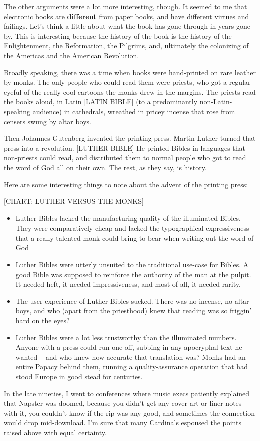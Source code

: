 The other arguments were a lot more interesting, though. It seemed
to me that electronic books are \textbf{different} from paper
books, and have different virtues and failings. Let's think a
little about what the book has gone through in years gone by. This
is interesting because the history of the book is the history of
the Enlightenment, the Reformation, the Pilgrims, and, ultimately
the colonizing of the Americas and the American Revolution.

Broadly speaking, there was a time when books were hand-printed on
rare leather by monks. The only people who could read them were
priests, who got a regular eyeful of the really cool cartoons the
monks drew in the margins. The priests read the books aloud, in
Latin [LATIN BIBLE] (to a predominantly non-Latin-speaking
audience) in cathedrals, wreathed in pricey incense that rose from
censers swung by altar boys.

Then Johannes Gutenberg invented the printing press. Martin Luther
turned that press into a revolution. [LUTHER BIBLE] He printed
Bibles in languages that non-priests could read, and distributed
them to normal people who got to read the word of God all on their
own. The rest, as they say, is history.

Here are some interesting things to note about the advent of the
printing press:

[CHART: LUTHER VERSUS THE MONKS]

\begin{itemize}
\item
  Luther Bibles lacked the manufacturing quality of the illuminated
  Bibles. They were comparatively cheap and lacked the typographical
  expressiveness that a really talented monk could bring to bear when
  writing out the word of God
\item
  Luther Bibles were utterly unsuited to the traditional use-case for
  Bibles. A good Bible was supposed to reinforce the authority of the
  man at the pulpit. It needed heft, it needed impressiveness, and
  most of all, it needed rarity.
\item
  The user-experience of Luther Bibles sucked. There was no incense,
  no altar boys, and who (apart from the priesthood) knew that
  reading was so friggin' hard on the eyes?
\item
  Luther Bibles were a lot less trustworthy than the illuminated
  numbers. Anyone with a press could run one off, subbing in any
  apocryphal text he wanted -- and who knew how accurate that
  translation was? Monks had an entire Papacy behind them, running a
  quality-assurance operation that had stood Europe in good stead for
  centuries.
\end{itemize}
In the late nineties, I went to conferences where music execs
patiently explained that Napster was doomed, because you didn't get
any cover-art or liner-notes with it, you couldn't know if the rip
was any good, and sometimes the connection would drop mid-download.
I'm sure that many Cardinals espoused the points raised above with
equal certainty.

